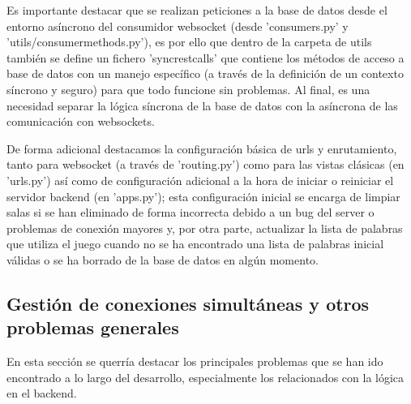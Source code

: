 \begin{itemize}
		  Es importante destacar que se realizan peticiones a la base de datos desde el entorno asíncrono del consumidor websocket (desde 'consumers.py' 
		  y 'utils/consumer\textunderscore methods.py'), es por ello que dentro de la carpeta de utils también se define un fichero 'sync\textunderscore rest\textunderscore calls' que contiene 
		  los métodos de acceso a base de datos con un manejo específico (a través de la definición de un contexto síncrono y seguro) para que todo funcione sin problemas. Al final, es una necesidad
		  separar la lógica síncrona de la base de datos con la asíncrona de las comunicación con websockets.
	
\end{itemize}

De forma adicional destacamos la configuración básica de urls y enrutamiento, tanto para websocket (a través de 'routing.py') como para las vistas clásicas (en 'urls.py') así como de 
configuración adicional a la hora de iniciar o reiniciar el servidor backend (en 'apps.py'); esta configuración inicial se encarga de limpiar salas si se han eliminado 
de forma incorrecta debido a un bug del server o problemas de conexión mayores y, por otra parte, actualizar la lista de palabras que utiliza el juego cuando no se ha encontrado
una lista de palabras inicial válidas o se ha borrado de la base de datos en algún momento.


\subsection{Gestión de conexiones simultáneas y otros problemas generales}

En esta sección se querría destacar los principales problemas que se han ido encontrado a lo largo del desarrollo, especialmente los relacionados con 
la lógica en el backend.

